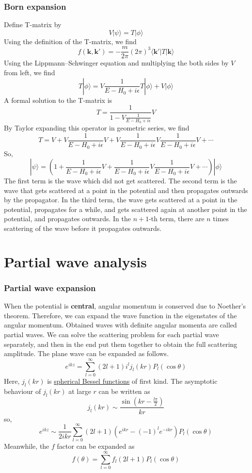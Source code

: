 \documentclass[cyan]{elegantnote}
\begin{document}
\subsubsection{Born expansion}
\noindent
Define T-matrix by
\[V | \psi \rangle = T |\phi\rangle\]
Using the definition of the T-matrix, we find
\[f(\bm{k},\bm{k}') = - \frac{m}{2\pi} (2\pi)^3  \langle \bm{k}'| T | \bm{k}\rangle \]
Using the Lippmann–Schwinger equation and multiplying the
both sides by $V$ from left, we find
\[ T |\phi\rangle = V \frac{1}{E-H_0 + i\epsilon}T|\phi\rangle + V|\phi\rangle\]
A formal solution to the T-matrix is
\[T = \frac{1}{1-V\frac{1}{E-H_0 + i\epsilon}}V\]
By Taylor expanding this operator in geometric series, we find
\[T = V + V \frac{1}{E-H_0 + i\epsilon} V + V \frac{1}{E-H_0 + i\epsilon} V \frac{1}{E-H_0 + i\epsilon} V + \cdots\]
So,
\[|\psi\rangle = \left( 1 +  \frac{1}{E-H_0 + i\epsilon} V +  \frac{1}{E-H_0 + i\epsilon} V \frac{1}{E-H_0 + i\epsilon} V + \cdots \right) | \phi \rangle\]
The first term is the wave which did not get scattered.
The second term is the wave that gets scattered at a point in the potential and then propagates outwards by the propagator. 
In the third term, the wave gets scattered at a point in the potential, propagates for a while, and gets scattered again at another point in the potential, and propagates outwards. 
In the $n+1$-th term, there are $n$ times scattering of the wave before it propagates outwards.

\section{Partial wave analysis}
\subsubsection{Partial wave expansion}
When the potential is \textbf{central}, angular momentum is conserved due to Noether's theorem. Therefore, we can expand the wave function in the eigenstates of the angular momentum. Obtained waves with definite angular momenta are called partial waves. We can solve the scattering problem for each partial wave separately, and then in the end put them together to obtain the full scattering amplitude.
The plane wave can be expanded as follows.
\[e^{ikz} = \sum_{l=0}^{\infty}(2l+1)i^l j_l(kr) P_l(\cos \theta)\]
Here, $j_l(kr)$ is \href{https://en.wikipedia.org/wiki/Bessel_function#Spherical_Bessel_functions:_jn.2C_yn}{spherical Bessel functions} of first kind. The asymptotic behaviour of $j_l(kr)$ at large $r$ can be written as
\[j_l(kr) \sim \frac{\sin(kr-\frac{l\pi}{2})}{kr}\]
so,
\[e^{ikz} \sim \frac{1}{2ikr} \sum_{l=0}^{\infty} (2l+1) (e^{ikr} - (-1)^l e^{-ikr})P_l(\cos \theta)\]
Meanwhile, the $f$ factor can be expanded as
\[f(\theta) = \sum_{l=0}^{\infty} f_l (2l+1)P_l(\cos \theta)\]
\end{document}
